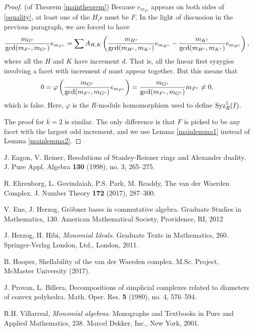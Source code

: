\documentclass[12pt]{amsart}
\numberwithin{equation}{section}
\theoremstyle{definition}
\begin{document}
\begin{proof}{(of Theorem \ref{maintheorem})}
Because $e_{m_{F^c}}$ appears on both sides of \eqref{equality}, at
least one of the $H_i$s must be $F$.  In the light
of discussion in the previous paragraph, we are forced to have
\[\frac{m_{G^c}}{{\rm gcd}(m_{F^c},m_{G^c})}e_{m_{F^c}} 
= \sum  A_{H,K} \left(\frac{m_{H^c}}{{\rm gcd}(m_{H^c},m_{K^c})}
e_{m_{K^c}} - 
\frac{m_{K^c}}{{\rm gcd}(m_{H^c},m_{K^c})}e_{m_{H^c}} \right),\]
where all the $H$ and $K$ have increment $d$.  That is,
all the linear first syzygies involving a facet 
with increment $d$ must appear together.  
But this means
that 
\[ 0 = \varphi\left(\frac{m_{G^c}}{{\rm gcd}(m_{F^c},m_{G^c})}e_{m_{F^c}}\right) = 
\frac{m_{G^c}}{{\rm gcd}(m_{F^c},m_{G^c})}m_{F^c} \neq 0,\]
which is false.  Here, $\varphi$ is the $R$-module homomorphism used to
define ${\rm Syz}_R^1(I)$.

The proof for $k=2$ is similar.  The only difference
is that  $F$ is picked to be any facet with the largest odd increment,
and we use Lemma \ref{mainlemma1} instead of Lemma \ref{mainlemma2}.
\end{proof}



\begin{thebibliography}{99}
J. Eagon, V. Reiner, 
Resolutions of Stanley-Reisner rings and Alexander duality. 
J. Pure Appl. Algebra {\bf 130} (1998), no. 3, 265--275.

 R. Ehrenborg, L. Govindaiah, P.S. Park, M. Readdy, 
The van der Waerden Complex. 
J. Number Theory {\bf 172} (2017), 287--300.

 V. Ene, J. Herzog, Gr\"obner bases in commutative algebra. 
Graduate Studies in Mathematics, 130. 
American Mathematical Society, Providence, RI, 2012

J. Herzog, H. Hibi,
{\it Monomial Ideals.}
Graduate Texts in Mathematics, 260.
Springer-Verlag London,
Ltd., London, 2011.

 B. Hooper, Shellability of the van der Waerden complex.
M.Sc. Project, McMaster University (2017).

J.  Provan, L. Billera, 
Decompositions of simplicial complexes related to diameters of convex polyhedra.
Math. Oper. Res. {\bf 5} (1980), no. 4, 576--594.

 R.H. Villarreal,
{\it Monomial algebras.}
Monographs and Textbooks in Pure and Applied Mathematics, 
238. Marcel Dekker, Inc., New York, 2001.
\end{thebibliography}
\end{document}
